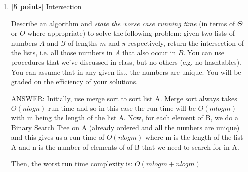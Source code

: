 \documentclass[11pt]{article}
\begin{document}
\begin{enumerate}
\item \textbf{[5 points]} Intersection

Describe an algorithm and \emph{state the worse case running time} (in terms of $\Theta$ or $O$ where appropriate) to solve the following problem: given two lists of numbers $A$ and $B$ of lengths $m$ and $n$ respectively, return the intersection of the lists, i.e. all those numbers in $A$ that also occur in $B$.  You can use procedures that we've discussed in class, but no others (e.g. no hashtables).  You can assume that in any given list, the numbers are unique.  You will be graded on the efficiency of your solutions.

ANSWER: Initially, use merge sort to sort list A. Merge sort always takes $O(nlogn)$ run time and so in this case the run time will be $O(mlogm)$ with m being the length of the list A. Now, for each element of B, we do a Binary Search Tree on A (already ordered and all the numbers are unique) and this gives us a run time of $O(nlogm)$ where m is the length of the list A and n is the number of elements of of B that we need to search for in A.

Then, the worst run time complexity is: $O(mlogm + nlogm) $


\end{enumerate}
\end{document}
